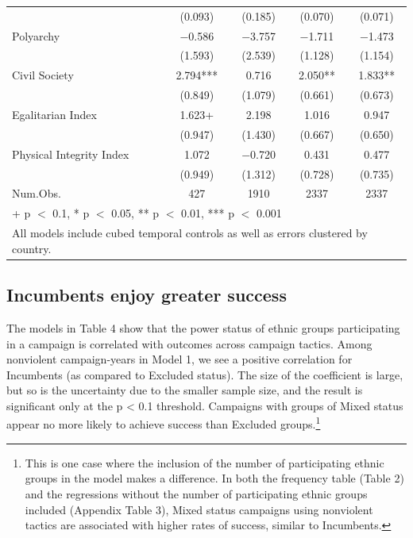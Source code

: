 \documentclass[
  letterpaper,
  DIV=11,
  numbers=noendperiod]{scrartcl}
\begin{document}
\begin{table}
{\begin{tabular}[t]{lcccc}
 & (\num{0.093}) & (\num{0.185}) & (\num{0.070}) & (\num{0.071})\\
Polyarchy & \num{-0.586} & \num{-3.757} & \num{-1.711} & \num{-1.473}\\
 & (\num{1.593}) & (\num{2.539}) & (\num{1.128}) & (\num{1.154})\\
Civil Society & \num{2.794}*** & \num{0.716} & \num{2.050}** & \num{1.833}**\\
 & (\num{0.849}) & (\num{1.079}) & (\num{0.661}) & (\num{0.673})\\
Egalitarian Index & \num{1.623}+ & \num{2.198} & \num{1.016} & \num{0.947}\\
 & (\num{0.947}) & (\num{1.430}) & (\num{0.667}) & (\num{0.650})\\
Physical Integrity Index & \num{1.072} & \num{-0.720} & \num{0.431} & \num{0.477}\\
 & (\num{0.949}) & (\num{1.312}) & (\num{0.728}) & (\num{0.735})\\
\midrule
Num.Obs. & \num{427} & \num{1910} & \num{2337} & \num{2337}\\
\bottomrule
\multicolumn{5}{l}{\rule{0pt}{1em}+ p $<$ 0.1, * p $<$ 0.05, ** p $<$ 0.01, *** p $<$ 0.001}\\
\multicolumn{5}{l}{\rule{0pt}{1em}All models include cubed temporal controls as well as errors clustered by country.}\\
\end{tabular}}
\end{table}

\subsection{}\label{section-1}

\subsection{\texorpdfstring{\textbf{Incumbents enjoy greater
success}}{Incumbents enjoy greater success}}\label{incumbents-enjoy-greater-success}

The models in Table 4 show that the power status of ethnic groups
participating in a campaign is correlated with outcomes across campaign
tactics. Among nonviolent campaign-years in Model 1, we see a positive
correlation for Incumbents (as compared to Excluded status). The size of
the coefficient is large, but so is the uncertainty due to the smaller
sample size, and the result is significant only at the p \textless{} 0.1
threshold. Campaigns with groups of Mixed status appear no more likely
to achieve success than Excluded groups.\footnote{This is one case where
  the inclusion of the number of participating ethnic groups in the
  model makes a difference. In both the frequency table (Table 2) and
  the regressions without the number of participating ethnic groups
  included (Appendix Table 3), Mixed status campaigns using nonviolent
  tactics are associated with higher rates of success, similar to
  Incumbents.}
\end{document}
